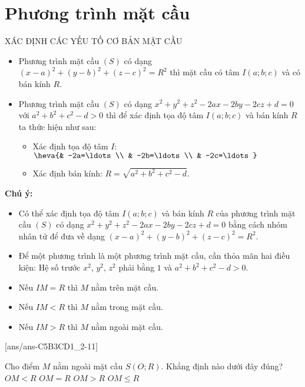 \setcounter{section}{2}
\section{Phương trình mặt cầu}
	
\begin{dang}{XÁC ĐỊNH CÁC YẾU TỐ CƠ BẢN MẶT CẦU}
	\begin{itemize}
		\item Phương trình mặt cầu $(S)$ có dạng $(x-a)^2+(y-b)^2+(z-c)^2=R^2$ thì mặt cầu có tâm $I(a;b;c)$ và có bán kính $R$.
		\item Phương trình mặt cầu $(S)$ có dạng $x^2+y^2+z^2-2ax-2by-2cz+d=0$ với $a^2+b^2+c^2-d>0$ thì để xác định tọa độ tâm $I(a;b;c)$ và bán kính $R$ ta thức hiện như sau:
		\begin{itemize}
			\item Xác định tọa độ tâm $I$: $\heva{& -2a=\ldots \\ & -2b=\ldots \\ & -2c=\ldots}$
			\item Xác định bán kính: $R=\sqrt{a^2+b^2+c^2-d}$.
		\end{itemize}
	\end{itemize}
	\begin{note} \textbf{Chú ý:}
		\begin{itemize}
			\item Có thể xác định tọa độ tâm $I(a;b;c)$ và bán kính $R$ của phương trình mặt cầu $(S)$ có dạng $x^2+y^2+z^2-2ax-2by-2cz+d=0$ bằng cách nhóm nhân tử để đưa về dạng $(x-a)^2+(y-b)^2+(z-c)^2=R^2$.
			\item Để một phương trình là một phương trình mặt cầu, cần thỏa mãn hai điều kiện: Hệ số trước $x^2$, $y^2$, $z^2$ phải bằng $1$ và $a^2+b^2+c^2-d>0$.
			\item Nếu $IM=R$ thì $M$ nằm trên mặt cầu.
			\item Nếu $IM<R$ thì $M$ nằm trong mặt cầu.
			\item Nếu $IM>R$ thì $M$ nằm ngoài mặt cầu.
		\end{itemize}
	\end{note}
\end{dang}
[ans/ans-C5B3CD1_2-11]
\TN

\begin{ex}%
	Cho điểm $M$ nằm ngoài mặt cầu $S(O;R)$. Khẳng định nào dưới đây đúng?
	\choice
	{$OM<R$}
	{$OM=R$}
	{\True $OM>R$}
	{$OM\le R$}
\end{ex}

